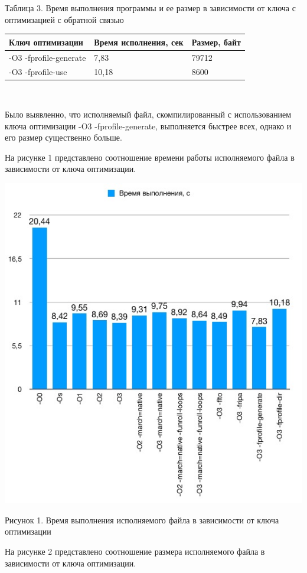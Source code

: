 \documentclass[12pt,a4paper]{scrartcl}
\begin{document}
\begin{center}
\caption{Таблица 3. Время выполнения программы и ее размер в зависимости от ключа с оптимизацией с обратной связью}
\begin{tabular}{| l | l | l |}
\hline
Ключ оптимизации & Время исполнения, сек & Размер, байт  \\ \hline
-O3 -fprofile-generate & 7,83 & 79712\\
-O3 -fprofile-use &	10,18 & 8600\\
\hline
\end{tabular}\\
\end{center}
\par
Было выявленно, что исполняемый файл, скомпилированный с использованием ключа оптимизации -O3 -fprofile-generate, выполняется быстрее всех, однако и его размер существенно больше.
\par
На рисунке 1 представлено соотношение времени работы исполняемого файла в зависимости от ключа оптимизации.
\begin{center}
\includegraphics[width=\linewidth]{time.jpg}
\caption{Рисунок 1. Время выполнения исполняемого файла в зависимости от ключа оптимизации}
\end{center}
На рисунке 2 представлено соотношение размера исполняемого файла в зависимости от ключа оптимизации.
\end{document}
